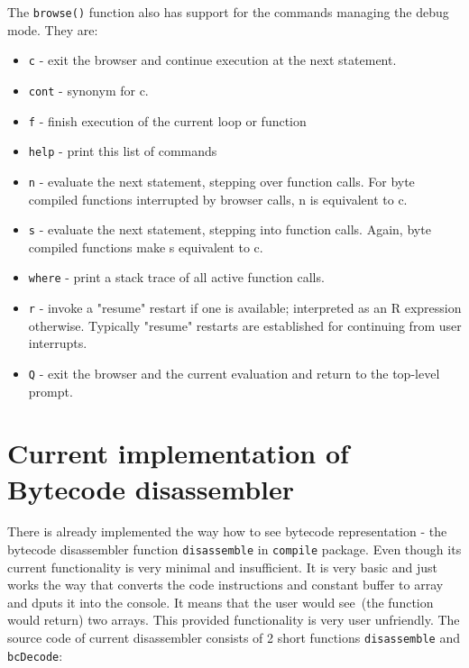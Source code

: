 \documentclass[thesis=M,english]{FITthesis}[2018/10/20]
\newcommand{\code}[1]{\texttt{#1}}
\begin{document}
The \code{browse()} function also has support for the commands managing the debug mode. They are:
\begin{itemize}
\item \code{c} - exit the browser and continue execution at the next statement.
\item \code{cont} - synonym for c.
\item \code{f} - finish execution of the current loop or function
\item \code{help} - print this list of commands
\item \code{n} - evaluate the next statement, stepping over function calls. For byte compiled functions  interrupted by browser calls, n is equivalent to c.
\item \code{s} - evaluate the next statement, stepping into function calls. Again, byte compiled functions make s equivalent to c.
\item \code{where} - print a stack trace of all active function calls.
\item \code{r} - invoke a "resume" restart if one is available; interpreted as an R expression otherwise. Typically "resume" restarts are established for continuing from user interrupts.
\item \code{Q} - exit the browser and the current evaluation and return to the top-level prompt.

\end{itemize}

\section{Current implementation of Bytecode disassembler}\label{current-bc-disassembler}

There is already implemented the way how to see bytecode representation - the bytecode disassembler function \code{disassemble} in \code{compile} package. Even though its current functionality is very minimal and insufficient. It is very basic and just works the way that converts the code instructions and constant buffer to array and dputs it into the console. It means that the user would see~(the function would return) two arrays. This provided functionality is very user unfriendly. The source code of current disassembler consists of 2 short functions \code{disassemble} and \code{bcDecode}:
\end{document}
